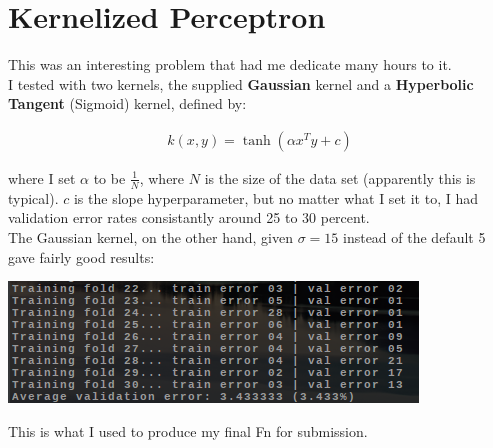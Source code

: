 \documentclass{article}
\begin{document}
\section{Kernelized Perceptron}
This was an interesting problem that had me dedicate many hours to it.\\
I tested with two kernels, the supplied \textbf{Gaussian} kernel and a
\textbf{Hyperbolic Tangent} (Sigmoid) kernel, defined by:

\begin{align*}
  k(x,y) = \tanh(\alpha x^Ty + c)
\end{align*}

where I set $\alpha$ to be $\frac{1}{N}$, where $N$ is the size of the
data set (apparently this is typical). $c$ is the slope hyperparameter,
but no matter what I set it to, I had validation error rates consistantly
around 25 to 30 percent.\\

The Gaussian kernel, on the other hand, given $\sigma = 15$ instead
of the default 5 gave fairly good results:

\begin{center}
  \includegraphics{gauss-15}
\end{center}

This is what I used to produce my final Fn for submission.
\end{document}
